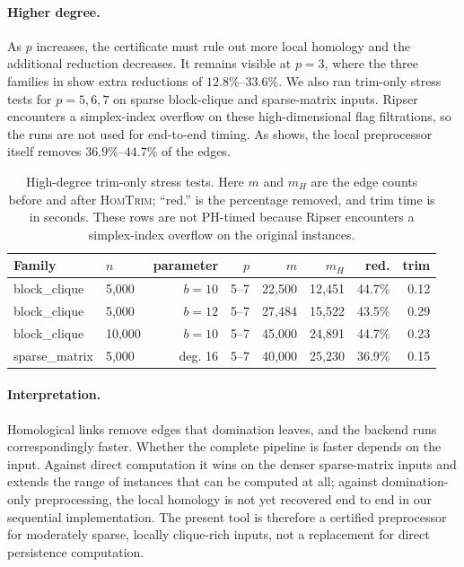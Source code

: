 \documentclass[11pt,letterpaper]{article}
\theoremstyle{definition}
\begin{document}
\paragraph{Higher degree.}
As $p$ increases, the certificate must rule out more local homology and the
additional reduction decreases. It remains visible at $p=3$, where the three
families in  show extra reductions of
$12.8\%$--$33.6\%$. We also ran trim-only stress tests for $p=5,6,7$ on sparse
block-clique and sparse-matrix inputs. Ripser encounters a simplex-index
overflow on these high-dimensional flag filtrations, so the runs are not used
for end-to-end timing. As  shows, the local
preprocessor itself removes $36.9\%$--$44.7\%$ of the edges.

\begin{table}[ht]
\centering
\scriptsize
\setlength{\tabcolsep}{3.2pt}
\renewcommand{\arraystretch}{0.95}
\begin{tabular}{llrrrrrr}
\toprule
Family & \(n\) & parameter & \(p\) & \(m\) & \(m_H\) & red. & trim \\
\midrule
block\_clique & 5,000 & \(b=10\) & 5--7 & 22,500 & 12,451 & 44.7\% & 0.12 \\
block\_clique & 5,000 & \(b=12\) & 5--7 & 27,484 & 15,522 & 43.5\% & 0.29 \\
block\_clique & 10,000 & \(b=10\) & 5--7 & 45,000 & 24,891 & 44.7\% & 0.23 \\
sparse\_matrix & 5,000 & deg. 16 & 5--7 & 40,000 & 25,230 & 36.9\% & 0.15 \\
\bottomrule
\end{tabular}
\caption{High-degree trim-only stress tests. Here $m$ and $m_H$ are the edge
counts before and after \textsc{HomTrim}; ``red.'' is the percentage removed,
and trim time is in seconds. These rows are not PH-timed because Ripser
encounters a simplex-index overflow on the original instances.}
\label{tab:high-p-trim-only}
\end{table}


\paragraph{Interpretation.}
Homological links remove edges that domination leaves, and the backend runs
correspondingly faster. Whether the complete pipeline is faster depends on the
input. Against direct computation it wins on the denser sparse-matrix inputs
and extends the range of instances that can be computed at all; against
domination-only preprocessing, the local homology is not yet recovered end to
end in our sequential implementation. The present tool is therefore a
certified preprocessor for moderately sparse, locally clique-rich inputs, not
a replacement for direct persistence computation.
\end{document}
